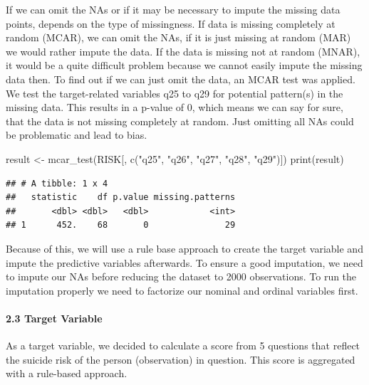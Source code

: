 \documentclass[
]{article}
\newenvironment{Shaded}{\begin{snugshade}}{\end{snugshade}}
\newcommand{\FunctionTok}[1]{\textcolor[rgb]{0.00,0.00,0.00}{#1}}
\newcommand{\NormalTok}[1]{#1}
\newcommand{\OtherTok}[1]{\textcolor[rgb]{0.56,0.35,0.01}{#1}}
\newcommand{\StringTok}[1]{\textcolor[rgb]{0.31,0.60,0.02}{#1}}
\begin{document}
\hfill\break
If we can omit the NAs or if it may be necessary to impute the missing
data points, depends on the type of missingness. If data is missing
completely at random (MCAR), we can omit the NAs, if it is just missing
at random (MAR) we would rather impute the data. If the data is missing
not at random (MNAR), it would be a quite difficult problem because we
cannot easily impute the missing data then. To find out if we can just
omit the data, an MCAR test was applied.\\
We test the target-related variables q25 to q29 for potential pattern(s)
in the missing data. This results in a p-value of 0, which means we can
say for sure, that the data is not missing completely at random. Just
omitting all NAs could be problematic and lead to bias.\\

\begin{Shaded}
\begin{Highlighting}[]
\NormalTok{result }\OtherTok{\textless{}{-}} \FunctionTok{mcar\_test}\NormalTok{(RISK[, }\FunctionTok{c}\NormalTok{(}\StringTok{"q25"}\NormalTok{, }\StringTok{"q26"}\NormalTok{, }\StringTok{"q27"}\NormalTok{, }\StringTok{"q28"}\NormalTok{, }\StringTok{"q29"}\NormalTok{)])}
\FunctionTok{print}\NormalTok{(result)}
\end{Highlighting}
\end{Shaded}

\begin{verbatim}
## # A tibble: 1 x 4
##   statistic    df p.value missing.patterns
##       <dbl> <dbl>   <dbl>            <int>
## 1      452.    68       0               29
\end{verbatim}

Because of this, we will use a rule base approach to create the target
variable and impute the predictive variables afterwards. To ensure a
good imputation, we need to impute our NAs before reducing the dataset
to 2000 observations. To run the imputation properly we need to
factorize our nominal and ordinal variables first.

\hypertarget{target-variable}{%
\paragraph{2.3 Target Variable}\label{target-variable}}

\hfill\break
As a target variable, we decided to calculate a score from 5 questions
that reflect the suicide risk of the person (observation) in question.
This score is aggregated with a rule-based approach.
\end{document}

